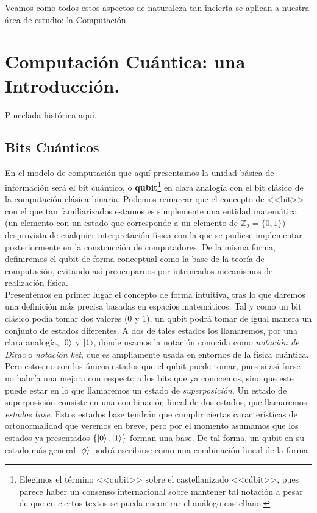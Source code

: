 \documentclass[11pt, spanish]{report}
\numberwithin{equation}{section}
\numberwithin{defin}{section}
\begin{document}
Veamos como todos estos aspectos de naturaleza tan incierta se aplican a nuestra área de estudio: la Computación.



\chapter{Computación Cuántica: una Introducción.}\label{chap:qubits}

Pincelada histórica aquí.

\section{Bits Cuánticos}\label{sec:qubits}

En el modelo de computación que aquí presentamos la unidad básica de información será el bit cuántico, o \textbf{qubit}\footnote{Elegimos el término <<qubit>> sobre el castellanizado <<cúbit>>, pues parece haber un consenso internacional sobre mantener tal notación a pesar de que en ciertos textos se pueda encontrar el análogo castellano.} en clara analogía con el bit clásico de la computación clásica binaria. Podemos remarcar que el concepto de <<bit>> con el que tan familiarizados estamos es simplemente una entidad matemática (un elemento con un estado que corresponde a un elemento de $\mathbb{Z}_2=\{0,1\}$) desprovista de cualquier interpretación física con la que se pudiese implementar posteriormente en la construcción de computadores. De la misma forma, definiremos el qubit de forma conceptual como la base de la teoría de computación, evitando así preocuparnos por intrincados mecanismos de realización física.\\

Presentemos en primer lugar el concepto de forma intuitiva, tras lo que daremos una definición más precisa basadas en espacios matemáticos. Tal y como un bit clásico podía tomar dos valores ($0$ y $1$), un qubit podrá tomar de igual manera un conjunto de estados diferentes. A dos de tales estados los llamaremos, por una clara analogía, $\ket{0}$ y $\ket{1}$, donde usamos la notación conocida como \textit{notación de Dirac} o \textit{notación ket}, que es ampliamente usada en entornos de la física cuántica.\\

Pero estos no son los únicos estados que el qubit puede tomar, pues si así fuese no habría una mejora con respecto a los bits que ya conocemos, sino que este puede estar en lo que llamaremos un estado de \textit{superposición}. Un estado de superposición consiste en una combinación lineal de dos estados, que llamaremos \textit{estados base}. Estos estados base tendrán que cumplir ciertas características de ortonormalidad que veremos en breve, pero por el momento asumamos que los estados ya presentados $\{\ket{0},\ket{1}\}$ forman una base. De tal forma, un qubit en su estado más general $\ket{\phi}$ podrá escribirse como una combinación lineal de la forma
\end{document}
